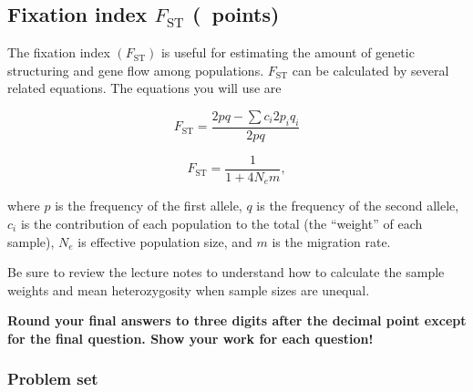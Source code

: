 \documentclass[12pt, addpoints, hidelinks]{exam}
\newcommand{\fst}{$F_{\mathrm{ST}}$}
\begin{document}

\subsection*{Fixation index \fst{} (\numpoints\ points)}

The fixation index $(F_\mathrm{ST})$ is useful for estimating the amount of genetic structuring and gene flow among populations. \fst{} can be calculated by several related equations. The equations you will use are
\begin{multicols}{2}
\noindent	
\begin{equation}
F_\mathrm{ST} = \dfrac{2pq-\sum c_i2p_iq_i}{2pq}
\end{equation}

	
	\columnbreak
	
\noindent	
\begin{equation}
F_\mathrm{ST} = \dfrac{1}{1+4N_em},
\end{equation}%
\end{multicols}

where $p$ is the frequency of the first allele, $q$ is the frequency of the second allele, $c_i$ is the contribution of each population to the total (the “weight” of each sample), $N_e$ is effective population size, and $m$ is the migration rate.

Be sure to review the lecture notes to understand how to calculate the sample weights and mean heterozygosity when sample sizes are unequal.

\textbf{Round your final answers to three digits after the decimal point except for the final question. Show your work for each question!}

\subsubsection*{Problem set}
\end{document}
